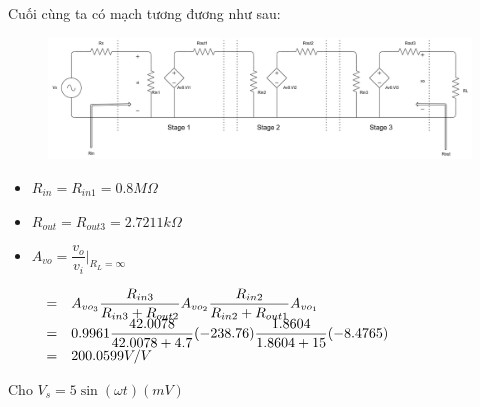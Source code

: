 \noindent Cuối cùng ta có mạch tương đương như sau:

\begin{figure}[H]
	\centering
	\includegraphics[width=.9\linewidth]{./my-chapters/my-diagrams/Question6/caub_1.png}
\end{figure}

\begin{itemize}[label =-]
	\item $R_{in} = R_{in1} = 0.8M \Omega$
	\item $R_{out} = R_{out3} = 2.7211k \Omega$
	\item 
	$A_{vo} = \dfrac{v_{o}}{v_{i}}|_{R_{L} = \infty}$
	
	$\begin{matrix}
			   & = & A_{vo_{3}} \dfrac{R_{in3}}{R_{in3} + R_{out2}} A_{vo_{2}} \dfrac{R_{in2}}{R_{in2} + R_{out1}}A_{vo_{1}} \hfill\\
			   & = & 0.9961 \dfrac{42.0078}{42.0078 + 4.7} (-238.76) \dfrac{1.8604}{1.8604 + 15} (-8.4765) \hfill\\
			   & = & 200.0599 V/V \hfill
	\end{matrix}$
\end{itemize}


\noindent Cho $V_{s} = 5\sin\left(\omega t\right) (mV)$